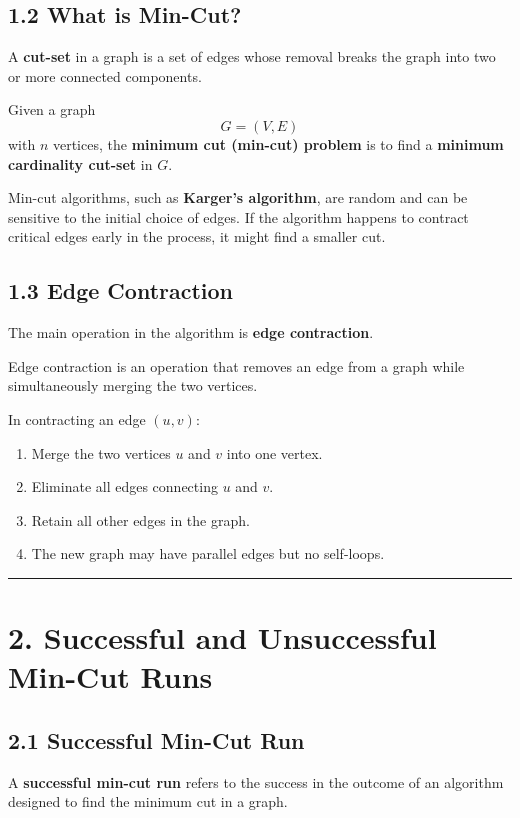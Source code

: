 \documentclass[12pt]{article}
\begin{document}
\subsection*{1.2 What is Min-Cut?}

A \textbf{cut-set} in a graph is a set of edges whose removal breaks the graph into two or more connected components.

Given a graph
\[
G = (V, E)
\]
with \( n \) vertices, the \textbf{minimum cut (min-cut) problem} is to find a \textbf{minimum cardinality cut-set} in \( G \).

Min-cut algorithms, such as \textbf{Karger’s algorithm}, are random and can be sensitive to the initial choice of edges. If the algorithm happens to contract critical edges early in the process, it might find a smaller cut.

\subsection*{1.3 Edge Contraction}

The main operation in the algorithm is \textbf{edge contraction}.

Edge contraction is an operation that removes an edge from a graph while simultaneously merging the two vertices.

In contracting an edge \( (u, v) \):

\begin{enumerate}
    \item Merge the two vertices \( u \) and \( v \) into one vertex.
    \item Eliminate all edges connecting \( u \) and \( v \).
    \item Retain all other edges in the graph.
    \item The new graph may have parallel edges but no self-loops.
\end{enumerate}

\hrule
\vspace{0.5cm}

\section*{2. Successful and Unsuccessful Min-Cut Runs}

\subsection*{2.1 Successful Min-Cut Run}

A \textbf{successful min-cut run} refers to the success in the outcome of an algorithm designed to find the minimum cut in a graph.
\end{document}
